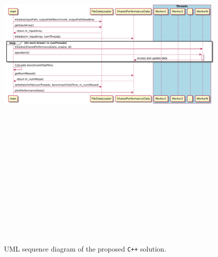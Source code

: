\begin{figure}[htbp] %
	\centering
	\includegraphics[width=1\textwidth, height=20cm]{figures/mpbenchmark_sequence.png} %
	\caption{UML sequence diagram of the proposed \texttt{C++} solution.}
	\label{fig:mpbenchmark_UML_diagram2} %
\end{figure}

